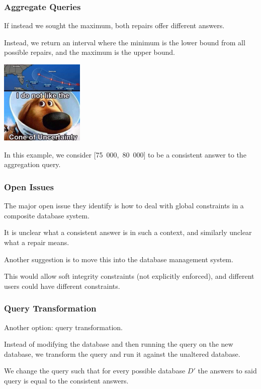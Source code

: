 \begin{frame}
\frametitle{Aggregate Queries}

If instead we sought the maximum, both repairs offer different answers. 

Instead, we return an interval where the minimum is the lower bound from all possible repairs, and the maximum is the upper bound. 


\begin{center}
	\includegraphics[width=0.3\textwidth]{images/uncertainty.jpg}
\end{center}

In this example, we consider [75~000,~80~000] to be a consistent answer to the aggregation query.

\end{frame}

\begin{frame}
\frametitle{Open Issues}

The major open issue they identify is how to deal with global constraints in a composite database system. 

It is unclear what a consistent answer is in such a context, and similarly unclear what a repair means.

Another suggestion is to move this into the database management system. 

This would allow soft integrity constraints (not explicitly enforced), and different users could have different constraints.

\end{frame}

\begin{frame}
\frametitle{Query Transformation}

Another option: query transformation. 

Instead of modifying the database and then running the query on the new database, we transform the query and run it against the unaltered database. 

We change the query such that for every possible database $D'$ the answers to said query is equal to the consistent answers.


\end{frame}

